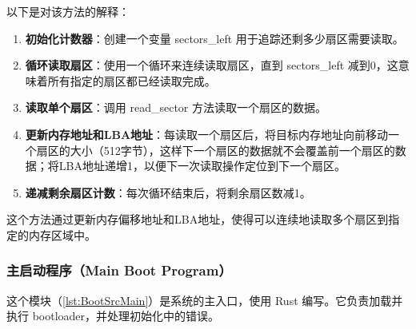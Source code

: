 以下是对该方法的解释：

\begin{enumerate}
    \item \textbf{初始化计数器}：创建一个变量 sectors\_left 用于追踪还剩多少扇区需要读取。
    \item \textbf{循环读取扇区}：使用一个循环来连续读取扇区，直到 sectors\_left 减到0，这意味着所有指定的扇区都已经读取完成。
    \item \textbf{读取单个扇区}：调用 read\_sector 方法读取一个扇区的数据。
    \item \textbf{更新内存地址和LBA地址}：每读取一个扇区后，将目标内存地址向前移动一个扇区的大小（512字节），这样下一个扇区的数据就不会覆盖前一个扇区的数据；将LBA地址递增1，以便下一次读取操作定位到下一个扇区。
    \item \textbf{递减剩余扇区计数}：每次循环结束后，将剩余扇区数减1。
\end{enumerate}

这个方法通过更新内存偏移地址和LBA地址，使得可以连续地读取多个扇区到指定的内存区域中。

\subsubsection{主启动程序（Main Boot Program）}\label{sec:MainBootProgram}

这个模块（\cref{lst:BootSrcMain}）是系统的主入口，使用 Rust 编写。它负责加载并执行 bootloader，并处理初始化中的错误。

